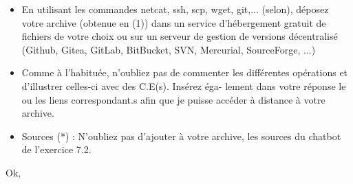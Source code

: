 \documentclass[a4paper,11pt]{article}
\begin{document}
            \begin{itemize}
                \item En utilisant les commandes netcat, ssh, scp, wget, git,... (selon), déposez votre archive (obtenue en (1)) dans un service d’hébergement gratuit de fichiers de votre choix ou sur un serveur de
                gestion de versions décentralisé (Github, Gitea, GitLab, BitBucket, SVN, Mercurial, SourceForge, ...)

                \item Comme à l’habituée, n’oubliez pas de commenter les différentes opérations et d’illustrer celles-ci avec des C.E(s). Insérez éga-
                lement dans votre réponse le ou les liens correspondant.s afin que je puisse accéder à distance à votre archive.

                \item Sources (*) : N’oubliez pas d’ajouter à votre archive, les sources
                du chatbot de l’exercice 7.2.
            \end{itemize}

            \bigskip
            \noindent Ok, 
\end{document}
